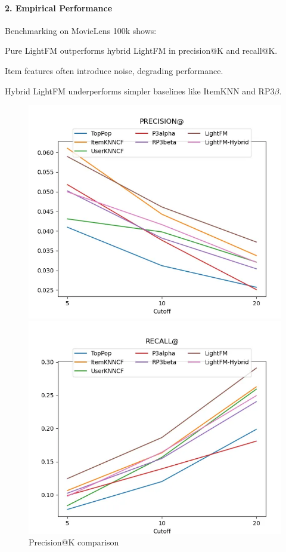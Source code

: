 \paragraph{2. Empirical Performance}
Benchmarking on MovieLens 100k \cite{shu2023lightfm} shows:
\item Pure LightFM outperforms hybrid LightFM in precision@K and recall@K.
    \item Item features often introduce noise, degrading performance.
    \item Hybrid LightFM underperforms simpler baselines like ItemKNN and RP3$\beta$.

\begin{figure}[H]
    \centering
    \begin{minipage}{0.48\textwidth}
        \centering
        \includegraphics[width=\linewidth]{images/precision_plot.png}
        \caption{Precision@K comparison}
        \label{fig:precision}
    \end{minipage}\hfill
    \begin{minipage}{0.48\textwidth}
        \centering
        \includegraphics[width=\linewidth]{images/recall_plot.png}

\end{minipage}
\end{figure}
